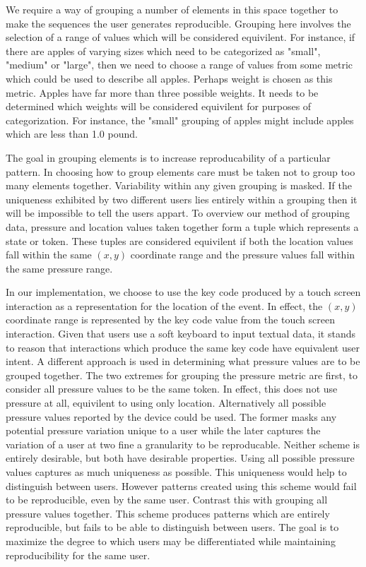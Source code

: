 We require a way of grouping a number of elements in this space together
to make the sequences the user generates reproducible.
%
Grouping here involves the selection of
a range of values which will be considered equivilent.
%
For instance, 
if there are apples of varying sizes
which need to be categorized as "small", "medium" or "large",
then we need to choose a range of values 
from some metric which could be used to describe all apples.
Perhaps weight is chosen as this metric.
Apples have far more than three possible weights.
It needs to be determined which weights will be considered equivilent for
purposes of categorization.
%
For instance, the "small" grouping of apples might include
apples which are less than 1.0 pound.

The goal in grouping elements is to
increase reproducability of a particular pattern.
%
In choosing how to group elements
care must be taken not to group too many 
elements together.
Variability within any given grouping 
is masked.
If 
the uniqueness exhibited by 
two different users lies entirely within
a grouping
then 
it will be impossible to tell the users appart.
%
To overview our method of grouping data,
pressure and location values taken together form a tuple
which represents a state or token.
These tuples are considered equivilent 
if both
the location values fall within the same $(x,y)$ coordinate range and
the pressure values fall within the same pressure range.

In our implementation,
we choose to use the key code produced by 
a touch screen interaction as a representation 
for the location of the event.
In effect,
the $(x,y)$ coordinate range
is represented by the
key code value from the touch screen interaction.
%
Given that users use a soft keyboard to input
textual data, it stands to reason that
interactions which produce the same key code have equivalent user intent.
%
A different approach is used in determining
what pressure values are to be grouped together.
%
The two extremes for grouping the pressure metric 
are first, 
to consider all pressure values to be the same token.
In effect, this does not use pressure at all, 
equivilent to using only location.
%
Alternatively all possible pressure values reported
by the device could be used.
%
The former masks any potential pressure variation unique to a user while
the later captures the variation of a user at two fine a granularity
to be reproducable.
Neither scheme is entirely desirable, 
but both have desirable properties.
%
Using all possible pressure values captures
as much uniqueness as possible.
This uniqueness would help to distinguish between users.
However patterns created using this scheme would 
fail to be reproducible, even by the same user.
%
Contrast this with grouping all pressure values together. 
This scheme produces patterns which are entirely reproducible, but
fails to be able to distinguish between users.
%
The goal is to maximize the degree to which users
may be differentiated while maintaining
reproducibility for the same user.

